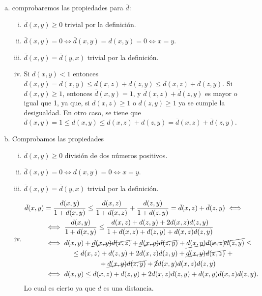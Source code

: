 \begin{ej}
	\begin{enumerate}[(a)]
		\item comprobaremos las propiedades para $\bar{d}$:
			\begin{enumerate}[i)]
				\item $\bar{d}(x,y) \geq 0$ trivial por la definición.
				\item $\bar{d}(x,y) = 0 \iff \bar{d}(x,y) = d(x,y) = 0 \iff x = y$.
				\item $\bar{d}(x,y) = \bar{d}(y,x)$ trivial por la definición.
				\item Si $d(x,y) < 1$ entonces $\bar{d}(x,y) = d(x,y) \leq d(x,z) + d(z,y) \leq \bar{d}(x,z) + \bar{d}(z,y)$. Si $d(x,y) \geq 1$,
					entonces $\bar{d}(x,y) = 1$, y $\bar{d}(x,z) + \bar{d}(z,y)$ es mayor o igual que 1, ya que, si $d(x,z) \geq 1$ o
					$d(z,y) \geq 1$ ya se cumple la desigualdad. En otro caso, se tiene que $\bar{d}(x,y) = 1 \leq d(x,y) \leq d(x,z) + d(z,y) =
					\bar{d}(x,z) + \bar{d}(z,y)$.
			\end{enumerate}
		\item Comprobamos las propiedades
			\begin{enumerate}[i)]
				\item $\bar{d}(x,y) \geq 0$ división de dos números positivos.
				\item $\bar{d}(x,y) = 0 \iff d(x,y) = 0 \iff x = y$.
				\item $\bar{d}(x,y) = \bar{d}(y,x)$ trivial por la definición.
				\item 
					\begin{align*}
						\bar{d}(x,y) &= \frac{d(x,y)}{1 + d(x,y)} \leq \frac{d(x,z)}{1 + d(x,z)} + \frac{d(z,y)}{1 + d(z,y)} =
						\bar{d}(x,z) + \bar{d}(z,y) \iff \\
						&\iff \frac{d(x,y)}{1+d(x,y)} \leq \frac{d(x,z) + d(z,y) + 2d(x,z)d(z,y)}{1 + d(x,z) + d(z,y) + d(x,z)d(z,y)} \\
						&\iff d(x,y) + \cancel{d(x,y)d(x,z)} + \cancel{d(x,y)d(z,y)} + \cancel{d(x,y)d(x,z)d(z,y)} \leq \\
						&\qquad\qquad\leq d(x,z) + d(z,y) + 2d(x,z)d(z,y) + \cancel{d(x,y)d(x,z)} \,\,+ \\
							&\qquad\qquad\qquad\qquad +\cancel{d(x,y)d(z,y)} + \cancel{2}d(x,y)d(x,z)d(z,y) \\
						&\iff d(x,y) \leq d(x,z) + d(z,y) + 2d(x,z)d(z,y) + d(x,y)d(x,z)d(z,y).
					\end{align*}
					Lo cual es cierto ya que $d$ es una distancia.

\end{enumerate}
\end{enumerate}
\end{ej}

